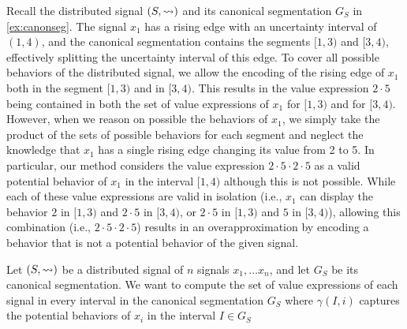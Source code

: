 \begin{example}
	Recall the distributed signal $(S, {\rightsquigarrow})$ and its canonical segmentation $G_S$ in \cref{ex:canonseg}.
	The signal $x_1$ has a rising edge with an uncertainty interval of $(1,4)$, and the canonical segmentation contains the segments $[1,3)$ and $[3,4)$, effectively splitting the uncertainty interval of this edge.
	To cover all possible behaviors of the distributed signal, we allow the encoding of the rising edge of $x_1$ both in the segment $[1,3)$ and in $[3,4)$.
	This results in the value expression $2 \cdot 5$ being contained in both the set of value expressions of $x_1$ for $[1,3)$ and for $[3,4)$.
	However, when we reason on possible the behaviors of $x_1$, we simply take the product of the sets of possible behaviors for each segment and neglect the knowledge that $x_1$ has a single rising edge changing its value from 2 to 5.
	In particular, our method considers the value expression $2 \cdot 5 \cdot 2 \cdot 5$ as a valid potential behavior of $x_1$ in the interval $[1,4)$ although this is not possible.
	While each of these value expressions are valid in isolation (i.e., $x_1$ can display the behavior $2$ in $[1,3)$ and $2 \cdot 5$ in $[3,4)$, or $2 \cdot 5$ in $[1,3)$ and $5$ in $[3,4)$), allowing this combination (i.e., $2 \cdot 5 \cdot 2 \cdot 5$) results in an overapproximation by encoding a behavior that is not a potential behavior of the given signal.
\end{example}

Let $(S,{\rightsquigarrow})$ be a distributed signal of $n$ signals $x_1, \ldots x_n$, and let $G_S$ be its canonical segmentation. %
We want to compute the set of value expressions of each signal in every interval in the canonical segmentation $G_S$ where $\gamma(I, i)$ captures the potential behaviors of $x_i$ in the interval $I \in G_S$

